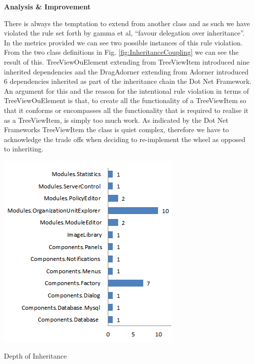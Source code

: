 		\vspace{-5mm}
		\begin{multicols}{2}	
			
			\large{\bfseries{Analysis \& Improvement}}
			\vspace{2mm}
			
			\normalsize
			{
				There is always the temptation to extend from another class and as such we have violated the rule set forth by
				gamma et al, ``favour delegation over inheritance''.
				\newline
				\newline
				In the metrics provided we can see two possible instances of this rule violation.	
				\newline
				\newline
				From the two class definitions in Fig. \ref{fig:InheritanceCoupling} we can see the result of this.
				TreeViewOuElement extending from TreeViewItem introduced nine inherited dependencies 
				and the DragAdorner extending from Adorner introduced 6 dependencies inherited as part of the inheritance chain
				the Dot Net Framework.
				\newline
				\newline
				An argument for this and the reason for the intentional rule violation in terms of TreeViewOuElement is that,
				to create all the functionality of a TreeViewItem so that it conforms or encompasses all the functionality that is
				required to realise it as a TreeViewItem, is simply too much work.  As indicated by the Dot Net Frameworks TreeViewItem
				the class is quiet complex, therefore we have to acknowledge the trade offs when deciding to re-implement the wheel
				as opposed to inheriting.  
				\newline
				\newline
			}		
			
			\columnbreak
				
			\begin{figurehere}
				\centering
				\includegraphics[scale=0.9]{pages/chapter4/figures/depth.png}
				\vspace{-6mm}
				\caption{Depth of Inheritance}
				\label{fig:DepthofInheritance}
			\end{figurehere}
			

\end{multicols}
